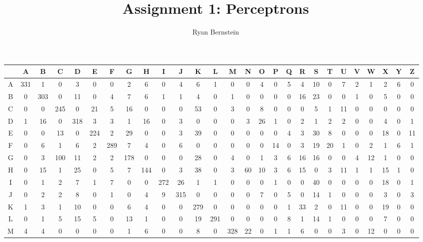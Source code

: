 \documentclass[11pt, oneside]{article}    %
\title{Assignment 1: Perceptrons}
\author{Ryan Bernstein}
\date{}
\begin{document}
\maketitle

\begingroup
\fontsize{9pt}{9pt}\selectfont
\begin{landscape}
\begin{tabular}{|c|c|c|c|c|c|c|c|c|c|c|c|c|c|c|c|c|c|c|c|c|c|c|c|c|c|c|}
  \hline
  & A & B & C & D & E & F & G & H & I & J & K & L & M & N & O & P & Q & R & S & T & U & V & W & X & Y & Z \\ \hline  
  A & 331 & 1 & 0 & 3 & 0 & 0 & 2 & 6 & 0 & 4 & 6 & 1 & 0 & 0 & 4 & 0 & 5 & 4 & 10 & 0 & 7 & 2 & 1 & 2 & 6 & 0 \\ \hline
  B & 0 & 303 & 0 & 11 & 0 & 4 & 7 & 6 & 1 & 1 & 4 & 0 & 1 & 0 & 0 & 0 & 0 & 16 & 23 & 0 & 0 & 1 & 0 & 5 & 0 & 0 \\ \hline
  C & 0 & 0 & 245 & 0 & 21 & 5 & 16 & 0 & 0 & 0 & 53 & 0 & 3 & 0 & 8 & 0 & 0 & 0 & 5 & 1 & 11 & 0 & 0 & 0 & 0 & 0 \\ \hline
  D & 1 & 16 & 0 & 318 & 3 & 3 & 1 & 16 & 0 & 3 & 0 & 0 & 0 & 3 & 26 & 1 & 0 & 2 & 1 & 2 & 2 & 0 & 0 & 4 & 0 & 1 \\ \hline
  E & 0 & 0 & 13 & 0 & 224 & 2 & 29 & 0 & 0 & 3 & 39 & 0 & 0 & 0 & 0 & 0 & 4 & 3 & 30 & 8 & 0 & 0 & 0 & 18 & 0 & 11 \\ \hline
  F & 0 & 6 & 1 & 6 & 2 & 289 & 7 & 4 & 0 & 6 & 0 & 0 & 0 & 0 & 0 & 14 & 0 & 3 & 19 & 20 & 1 & 0 & 2 & 1 & 6 & 1 \\ \hline
  G & 0 & 3 & 100 & 11 & 2 & 2 & 178 & 0 & 0 & 0 & 28 & 0 & 4 & 0 & 1 & 3 & 6 & 16 & 16 & 0 & 0 & 4 & 12 & 1 & 0 & 0 \\ \hline
  H & 0 & 15 & 1 & 25 & 0 & 5 & 7 & 144 & 0 & 3 & 38 & 0 & 3 & 60 & 10 & 3 & 6 & 15 & 0 & 3 & 11 & 1 & 1 & 15 & 1 & 0 \\ \hline
  I & 0 & 1 & 2 & 7 & 1 & 7 & 0 & 0 & 272 & 26 & 1 & 1 & 0 & 0 & 0 & 1 & 0 & 0 & 40 & 0 & 0 & 0 & 0 & 18 & 0 & 1 \\ \hline
  J & 0 & 2 & 2 & 8 & 0 & 1 & 0 & 4 & 9 & 315 & 0 & 0 & 0 & 0 & 7 & 0 & 5 & 0 & 14 & 1 & 0 & 0 & 0 & 3 & 0 & 3 \\ \hline
  K & 1 & 3 & 1 & 10 & 0 & 0 & 6 & 4 & 0 & 0 & 279 & 0 & 0 & 0 & 0 & 0 & 1 & 33 & 2 & 0 & 11 & 0 & 0 & 19 & 0 & 0 \\ \hline
  L & 0 & 1 & 5 & 15 & 5 & 0 & 13 & 1 & 0 & 0 & 19 & 291 & 0 & 0 & 0 & 0 & 8 & 1 & 14 & 1 & 0 & 0 & 0 & 7 & 0 & 0 \\ \hline
  M & 4 & 4 & 0 & 0 & 0 & 0 & 1 & 6 & 0 & 0 & 8 & 0 & 328 & 22 & 0 & 1 & 1 & 6 & 0 & 0 & 3 & 0 & 12 & 0 & 0 & 0 \\ \hline

\end{tabular}
\end{landscape}
\end{document}
